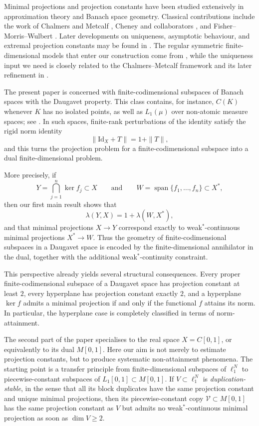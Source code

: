 \documentclass[11pt]{amsart}
\numberwithin{equation}{section}
\theoremstyle{definition}
\theoremstyle{remark}
\newcommand{\Id}{\mathrm{Id}}
\DeclareMathOperator{\spanop}{span}
\begin{document}
Minimal projections and projection constants have been studied extensively in approximation theory and Banach space geometry. Classical contributions include the work of Chalmers and Metcalf \cite{CM1,CM2}, Cheney and collaborators \cite{CF,CH,CM}, and Fisher--Morris--Wulbert \cite{FMW}. Later developments on uniqueness, asymptotic behaviour, and extremal projection constants may be found in \cite{HK1,HK3,HK4,KLL,LE2,LS,SK3,LM,FS2,BB22,BB23}. The regular symmetric finite-dimensional models that enter our construction come from \cite{CL1,CL2,CL3,CL4}, while the uniqueness input we need is closely related to the Chalmers--Metcalf framework and its later refinement in \cite{LP}.

The present paper is concerned with finite-codimensional subspaces of Banach spaces with the Daugavet property. This class contains, for instance, $C(K)$ whenever $K$ has no isolated points, as well as $L_1(\mu)$ over non-atomic measure spaces; see \cite{KSSW}. In such spaces, finite-rank perturbations of the identity satisfy the rigid norm identity
\[
\|\Id_X+T\|=1+\|T\|,
\]
and this turns the projection problem for a finite-codimensional subspace into a dual finite-dimensional problem.

More precisely, if
\[
Y=\bigcap_{j=1}^n \ker f_j\subset X
\qquad\text{and}\qquad
W=\spanop\{f_1,\dots,f_n\}\subset X^*,
\]
then our first main result shows that
\[
\lambda(Y,X)=1+\lambda(W,X^*),
\]
and that minimal projections $X\to Y$ correspond exactly to weak$^*$-continuous minimal projections $X^*\to W$. Thus the geometry of finite-codimensional subspaces in a Daugavet space is encoded by the finite-dimensional annihilator in the dual, together with the additional weak$^*$-continuity constraint.

This perspective already yields several structural consequences. Every proper finite-codimensional subspace of a Daugavet space has projection constant at least $2$, every hyperplane has projection constant exactly $2$, and a hyperplane $\ker f$ admits a minimal projection if and only if the functional $f$ attains its norm. In particular, the hyperplane case is completely classified in terms of norm-attainment.

The second part of the paper specialises to the real space $X=C[0,1]$, or equivalently to its dual $M[0,1]$. Here our aim is not merely to estimate projection constants, but to produce systematic non-attainment phenomena. The starting point is a transfer principle from finite-dimensional subspaces of $\ell_1^N$ to piecewise-constant subspaces of $L_1[0,1]\subset M[0,1]$. If $V\subset \ell_1^N$ is \emph{duplication-stable}, in the sense that all its block duplicates have the same projection constant and unique minimal projections, then its piecewise-constant copy $\mathscr V\subset M[0,1]$ has the same projection constant as $V$ but admits no weak$^*$-continuous minimal projection as soon as $\dim V\geqslant 2$.
\end{document}
